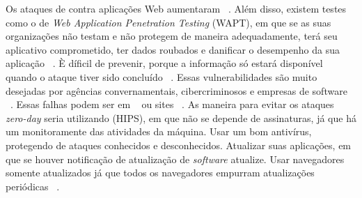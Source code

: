 \documentclass[brazil, utf8]{article}
\begin{document}
Os ataques de  contra aplicações Web aumentaram ~\cite{Kumar:2016}. Além disso, 
existem testes como o de \textit{Web Application Penetration Testing} (WAPT), em que se as suas 
organizações não testam e não protegem de maneira adequadamente, terá seu aplicativo comprometido, 
ter dados roubados e danificar o desempenho da sua aplicação ~\cite{Kumar:2016}. È díficil de 
prevenir, porque a informação só estará disponível quando o  ataque tiver sido concluído 
~\cite{Kumar:2016}. Essas vulnerabilidades são muito desejadas por agências convernamentais, 
cibercriminosos e empresas de software ~\cite{Kumar:2016}. Essas falhas podem ser em
~ ou sites ~\cite{Kumar:2016}. As maneira para evitar os ataques \textit{zero-day}
seria utilizando  (HIPS), em que não se depende de 
assinaturas, já que há um monitoramente das atividades da máquina. Usar um bom antivírus, 
protegendo de ataques conhecidos e desconhecidos. Atualizar suas aplicações, em que se houver 
notificação de atualização de \textit{software} atualize. Usar navegadores somente atualizados já 
que todos os navegadores empurram atualizações periódicas ~\cite{Kumar:2016}.
\end{document}
